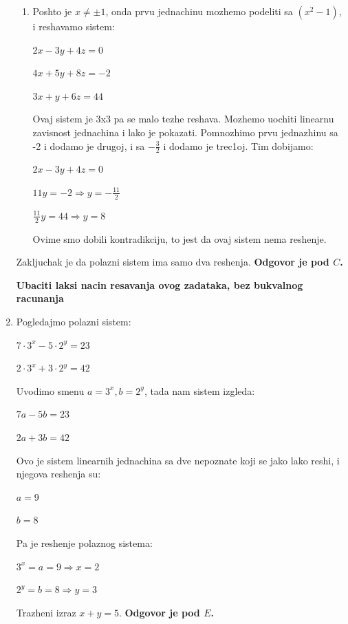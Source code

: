 \documentclass[a4paper,12pt]{article}
\begin{document}
\begin{enumerate}[1.]
\begin{enumerate}[1)]
\item Poshto je $x \neq \pm 1$, onda prvu jednachinu mozhemo podeliti sa $(x^2 - 1)$, i reshavamo sistem:
\begin{center}
\par $2x -3y + 4z = 0$
\par $4x + 5y +8z = -2$
\par $3x + y + 6z = 44$
\end{center}
\par Ovaj sistem je 3x3 pa se malo tezhe reshava. Mozhemo uochiti linearnu zavisnost jednachina i lako je pokazati. Pomnozhimo prvu jednazhinu sa -2 i dodamo je drugoj, i sa $-\frac{3}{2}$ i dodamo je trec1oj. Tim dobijamo:
\begin{center}
\par $2x -3y + 4z = 0$
\par $11y = -2 \Longrightarrow y = -\frac{11}{2}$
\par $\frac{11}{2}y = 44 \Longrightarrow y = 8$
\end{center}
\par Ovime smo dobili kontradikciju, to jest da ovaj sistem nema reshenje.
\end{enumerate}
\par Zakljuchak je da polazni sistem ima samo dva reshenja. \textbf{Odgovor je pod $C$.} 

\textbf{Ubaciti laksi nacin resavanja ovog zadataka, bez bukvalnog racunanja}

\item Pogledajmo polazni sistem:
\begin{center}
\par $7 \cdot 3^{x} - 5 \cdot 2^{y} = 23$
\par $2 \cdot 3^{x} + 3 \cdot 2^{y} = 42$
\end{center}
\par Uvodimo smenu $a = 3^x, b = 2^y$, tada nam sistem izgleda:
\begin{center}
\par $7 a - 5b = 23$
\par $2 a + 3 b = 42$
\end{center}
\par Ovo je sistem linearnih jednachina sa dve nepoznate koji se jako lako reshi, i njegova reshenja su:
\begin{center}
\par $a = 9$
\par $b = 8$
\end{center}
\par Pa je reshenje polaznog sistema:
\begin{center}
\par $3^x = a = 9\Longrightarrow x = 2$
\par $2^y = b = 8 \Longrightarrow y = 3$
\end{center}
\par Trazheni izraz $x+y = 5$. \textbf{Odgovor je pod $E$.}


\end{enumerate}
\end{document}
